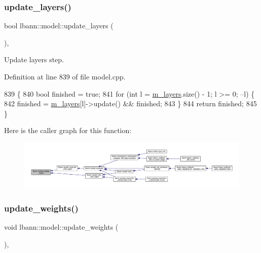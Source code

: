 \subsubsection{\texorpdfstring{update\+\_\+layers()}{update\_layers()}}
{\footnotesize\ttfamily bool lbann\+::model\+::update\+\_\+layers (\begin{DoxyParamCaption}{ }\end{DoxyParamCaption})\hspace{0.3cm}{\ttfamily [protected]}, {\ttfamily [virtual]}}

Update layers step. 

Definition at line 839 of file model.\+cpp.


\begin{DoxyCode}
839                           \{
840   \textcolor{keywordtype}{bool} finished = \textcolor{keyword}{true};
841   \textcolor{keywordflow}{for} (\textcolor{keywordtype}{int} l = \hyperlink{classlbann_1_1model_a0229fc226ec163d1411548446104569d}{m\_layers}.size() - 1; l >= 0; --l) \{
842     finished = \hyperlink{classlbann_1_1model_a0229fc226ec163d1411548446104569d}{m\_layers}[l]->update() && finished;
843   \}
844   \textcolor{keywordflow}{return} finished;
845 \}
\end{DoxyCode}
Here is the caller graph for this function\+:\nopagebreak
\begin{figure}[H]
\begin{center}
\leavevmode
\includegraphics[width=350pt]{classlbann_1_1model_a7518775e0fd29ed682319193e2d264cc_icgraph}
\end{center}
\end{figure}
\mbox{\label{classlbann_1_1model_a38d8924938fa69857d3f9ed83ac98ee9}} 
\subsubsection{\texorpdfstring{update\+\_\+weights()}{update\_weights()}}
{\footnotesize\ttfamily void lbann\+::model\+::update\+\_\+weights (\begin{DoxyParamCaption}{ }\end{DoxyParamCaption})\hspace{0.3cm}{\ttfamily [protected]}, {\ttfamily [virtual]}}

